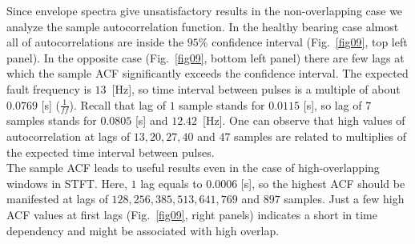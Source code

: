 \documentclass[3p,times]{elsarticle}
\begin{document}
Since envelope spectra give unsatisfactory results in the non-overlapping case we analyze the sample autocorrelation function. In the healthy bearing case almost all of autocorrelations are inside the $95\%$ confidence interval (Fig.~\ref{fig09}, top left panel). In the opposite case (Fig.~\ref{fig09}, bottom left panel) there are few lags at which the sample ACF significantly exceeds the confidence interval. The expected fault frequency is $13$~[Hz], so time interval between pulses is a multiple of about $0.0769$ [s] ($\frac{1}{ff}$). Recall that lag of $1$ sample stands for $0.0115$ [s], so lag of $7$ samples stands for $0.0805$ [s] and $12.42$~[Hz]. One can observe that high values of autocorrelation at lags of $13, 20, 27, 40$ and $47$ samples are related to multiplies of the expected time interval between pulses.\\
The sample ACF leads to useful results even in the case of high-overlapping windows in STFT. Here, $1$ lag equals to $0.0006$ [s], so the highest ACF should be manifested at lags of $128, 256, 385, 513, 641, 769$ and $897$ samples. Just a few high ACF values at first lags (Fig.~\ref{fig09}, right panels) indicates a short in time dependency and might be associated with high overlap.
\end{document}
